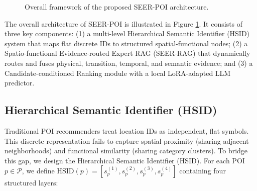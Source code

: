 \documentclass[10pt,twocolumn]{article}
\newcommand{\method}{SEER-POI}
\newcommand{\hsid}{HSID}
\begin{document}
\begin{figure}[t]
\caption{Overall framework of the proposed \method{} architecture.}
\label{fig:framework}
\end{figure}

The overall architecture of \method{} is illustrated in Figure \ref{fig:framework}. It consists of three key components: (1) a multi-level Hierarchical Semantic Identifier (\hsid) system that maps flat discrete IDs to structured spatial-functional nodes; (2) a Spatio-functional Evidence-routed Expert RAG (SEER-RAG) that dynamically routes and fuses physical, transition, temporal, and semantic evidence; and (3) a Candidate-conditioned Ranking module with a local LoRA-adapted LLM predictor.

\subsection{Hierarchical Semantic Identifier (HSID)}
Traditional POI recommenders treat location IDs as independent, flat symbols. This discrete representation fails to capture spatial proximity (sharing adjacent neighborhoods) and functional similarity (sharing category clusters). To bridge this gap, we design the Hierarchical Semantic Identifier (\hsid). For each POI $p \in \mathcal{P}$, we define $\mathrm{HSID}(p) = [s^{(1)}_p, s^{(2)}_p, s^{(3)}_p, s^{(4)}_p]$ containing four structured layers:
\end{document}
